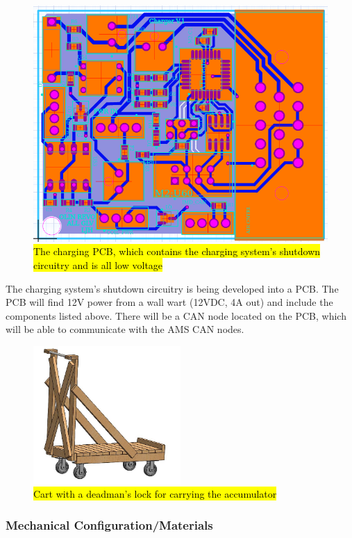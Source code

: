 \documentclass{article}
\DeclareRobustCommand{\hlr}[1]{{\sethlcolor{red}\hl{#1}}}
\begin{document}
            \begin{figure}[H]
                \centering
                \includegraphics[width = 0.7 \textwidth]{chargerPCB}
                \caption{\hlr{The charging PCB, which contains the charging system's shutdown circuitry and is all low voltage}}
                \label{chargeschem}
            \end{figure}

            The charging system's shutdown circuitry is being developed into a PCB. The PCB will find 12V power from a wall wart (12VDC, 4A out) and include the components listed above. There will be a CAN node located on the PCB, which will be able to communicate with the AMS CAN nodes.

            \begin{figure}[H]
                \centering
                \includegraphics[width = 0.5\textwidth]{Cart}
                \caption{\hlr{Cart with a deadman's lock for carrying the accumulator}}
                \label{cart}
            \end{figure}

        \subsubsection{Mechanical Configuration/Materials}
\end{document}
